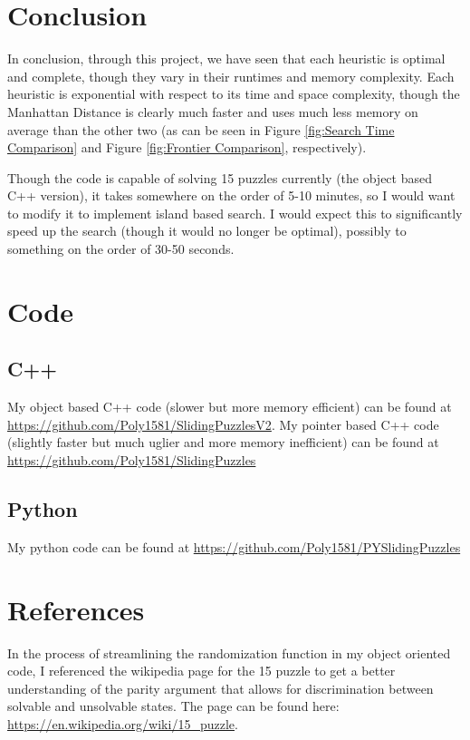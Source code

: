 \documentclass{article}
\begin{document}
\section{Conclusion}
In conclusion, through this project, we have seen that each heuristic is optimal and complete, though they vary in their runtimes and memory complexity. Each heuristic is exponential with respect to its time and space complexity, though the Manhattan Distance is clearly much faster and uses much less memory on average than the other two (as can be seen in Figure \ref{fig:Search Time Comparison} and Figure \ref{fig:Frontier Comparison}, respectively).
\par Though the code is capable of solving 15 puzzles currently (the object based C++ version), it takes somewhere on the order of 5-10 minutes, so I would want to modify it to implement island based search.  I would expect this to significantly speed up the search (though it would no longer be optimal), possibly to something on the order of 30-50 seconds.
\section{Code}
\subsection{C++}
My object based C++ code (slower but more memory efficient) can be found at \url{https://github.com/Poly1581/SlidingPuzzlesV2}. My pointer based C++ code (slightly faster but much uglier and more memory inefficient) can be found at \url{https://github.com/Poly1581/SlidingPuzzles}
\subsection{Python}
My python code can be found at \url{https://github.com/Poly1581/PYSlidingPuzzles}
\section{References}
In the process of streamlining the randomization function in my object oriented code, I referenced the wikipedia page for the 15 puzzle to get a better understanding of the parity argument that allows for discrimination between solvable and unsolvable states. The page can be found here: \url{https://en.wikipedia.org/wiki/15_puzzle}.
\end{document}

